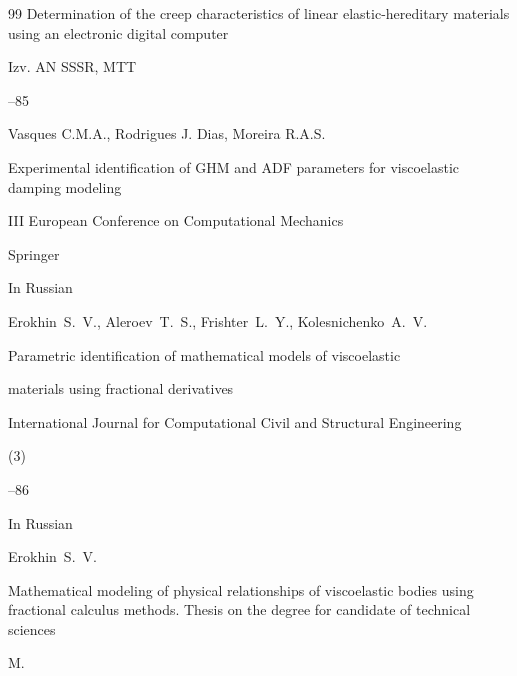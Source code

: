 \documentclass[11pt,a4paper,twoside]{article}
\begin{document}
\begin{thebibliography}{99}
\paper Determination of the creep characteristics of linear elastic-hereditary materials using an electronic digital computer


\jour  Izv. AN SSSR, MTT






–85







\by Vasques C.M.A., Rodrigues J. Dias,  Moreira R.A.S.


\paper Experimental identification of GHM and ADF parameters for viscoelastic damping modeling


\inbook III European Conference on Computational Mechanics


\publ  Springer











\lang In Russian


\by Erokhin~S.~V., Aleroev~T.~S., Frishter~L.~Y., Kolesnichenko~A.~V.


\paper Parametric identification of mathematical models of viscoelastic


materials using fractional derivatives


\jour International Journal for Computational Civil and Structural Engineering




(3)


--86







\lang In Russian


\by Erokhin~S.~V.


\book Mathematical modeling of physical relationships of viscoelastic bodies using fractional calculus methods. Thesis on the degree for candidate of technical sciences


\publaddr M.









 






\end{thebibliography}
\end{document}
